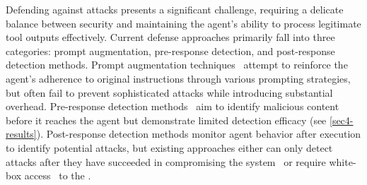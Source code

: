 Defending against \ipi attacks presents a significant challenge, requiring a delicate balance between security and maintaining the agent's ability to process legitimate tool outputs effectively. Current defense approaches primarily fall into three categories: prompt augmentation, pre-response detection, and post-response detection methods. Prompt augmentation techniques~\cite{hines2024defending, learning_prompt_sandwich_url,} attempt to reinforce the agent's adherence to original instructions through various prompting strategies, but often fail to prevent sophisticated attacks while introducing substantial overhead. Pre-response detection methods~\cite{deberta-v3-base-prompt-injection-v2, inan2023llama} aim to identify malicious content before it reaches the agent but demonstrate limited detection efficacy (see \cref{sec4-results}). Post-response detection methods monitor agent behavior after execution to identify potential attacks, but existing approaches either can only detect attacks after they have succeeded in compromising the system~\cite{liu2024formalizing} or require white-box access~\cite{hung2024attention} to the \llm.



